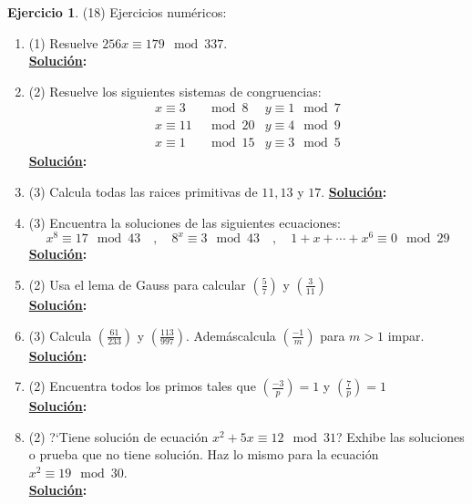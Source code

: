 \documentclass[11pt,letterpaper]{article}
\theoremstyle{definition}\newtheorem{p}{Ejercicio}
\newcommand{\leg}[2]{\left( \frac{#1}{#2}\right)} %
\newcommand{\sol}{\textbf{\underline{Solución}: }} %
\begin{document}
\begin{p}(18)
Ejercicios num\'ericos:
\begin{enumerate}
  \item(1) Resuelve $256x\equiv 179\mod 337$.\\
  \sol

  \item(2) Resuelve los siguientes sistemas de congruencias:
  \begin{align*}
    x\equiv 3&\mod 8 & y\equiv1\mod7  \\
    x\equiv 11&\mod 20 & y\equiv4\mod 9 \\
    x\equiv 1&\mod 15 & y\equiv 3\mod 5
  \end{align*}
  \sol

  \item(3) Calcula todas las raices primitivas de $11,13$ y $17$.
  \sol

  \item(3) Encuentra la soluciones de las siguientes ecuaciones:
  \[
    x^8\equiv 17 \mod 43 \quad,\quad 8^x\equiv 3\mod 43 \quad,\quad 1+x+\cdots+x^6\equiv 0\mod 29
  \]
  \sol

  \item(2) Usa el lema de Gauss para calcular $\left(\frac{5}{7}\right)$ y $\left(\frac{3}{11}\right)$\\
  \sol
  
  \item(3) Calcula $\left(\frac{61}{233}\right)$ y $\left(\frac{113}{997}\right)$.
  Adem\'ascalcula $\leg{-1}{m}$ para $m>1$ impar.\\
  \sol

  \item(2) Encuentra todos los primos tales que $\left(\frac{-3}{p}\right)=1$
  y $\left(\frac{7}{p}\right)=1$\\
  \sol

  \item(2) ?`Tiene soluci\'on de ecuaci\'on $x^2+5x\equiv 12\mod 31$? Exhibe las soluciones o prueba
  que no tiene soluci\'on. Haz lo mismo para la ecuaci\'on $x^2\equiv 19\mod 30$.\\
  \sol

\end{enumerate}

\end{p}
\end{document}
